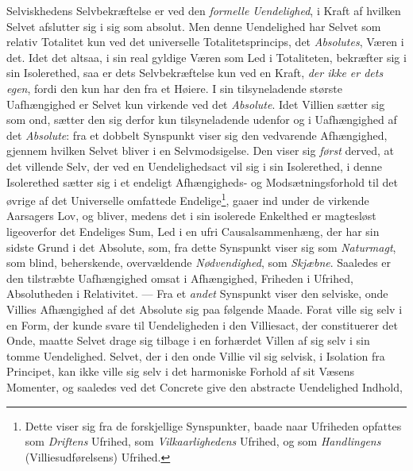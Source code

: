 Selviskhedens Selvbekræftelse er ved den \emph{formelle Uendelighed}, i Kraft af
hvilken Selvet afslutter sig i sig som absolut. Men denne Uendelighed har Selvet
som relativ Totalitet kun ved det universelle Totalitetsprincips, det
\emph{Absolutes}, Væren i det. Idet det altsaa, i sin real gyldige Væren som Led
i Totaliteten, bekræfter sig i sin Isolerethed, saa er dets Selvbekræftelse kun
ved en Kraft, \emph{der ikke er dets egen}, fordi den kun har den fra et Høiere.
I sin tilsyneladende største Uafhængighed er Selvet kun virkende ved det
\emph{Absolute}. Idet Villien sætter sig som ond, sætter den sig derfor kun
tilsyneladende udenfor og i Uafhængighed af det \emph{Absolute}: fra et dobbelt
Synspunkt viser sig den vedvarende Afhængighed, gjennem hvilken Selvet bliver i
en Selvmodsigelse. Den viser sig \emph{først} derved, at det villende Selv, der
ved en Uendelighedsact vil sig i sin Isolerethed, i denne Isolerethed sætter sig
i et endeligt Afhængigheds- og Modsætningsforhold til det øvrige af det
Universelle omfattede Endelige\footnote{Dette viser sig fra de forskjellige
Synspunkter, baade naar Ufriheden opfattes som \emph{Driftens} Ufrihed, som
\emph{Vilkaarlighedens} Ufrihed, og som \emph{Handlingens} (Villiesudførelsens)
Ufrihed.}, gaaer ind under de virkende Aarsagers Lov, og bliver, medens det i sin
isolerede Enkelthed er magtesløst ligeoverfor det Endeliges Sum, Led i en ufri
Causalsammenhæng, der har sin sidste Grund i det Absolute, som, fra dette
Synspunkt viser sig som \emph{Naturmagt}, som blind, beherskende, overvældende
\emph{Nødvendighed}, som \emph{Skjæbne}. Saaledes er den tilstræbte Uafhængighed
omsat i Afhængighed, Friheden i Ufrihed, Absolutheden i Relativitet. --- Fra et
\emph{andet} Synspunkt viser den selviske, onde Villies Afhængighed af det
Absolute sig paa følgende Maade. Forat ville sig selv i en Form, der kunde
 svare til Uendeligheden i den Villiesact, der constituerer det Onde, maatte
Selvet drage sig tilbage i en forhærdet Villen af sig selv i sin tomme
Uendelighed. Selvet, der i den onde Villie vil sig selvisk, i Isolation fra
Principet, kan ikke ville sig selv i det harmoniske Forhold af sit Væsens
Momenter, og saaledes ved det Concrete give den abstracte Uendelighed Indhold,
